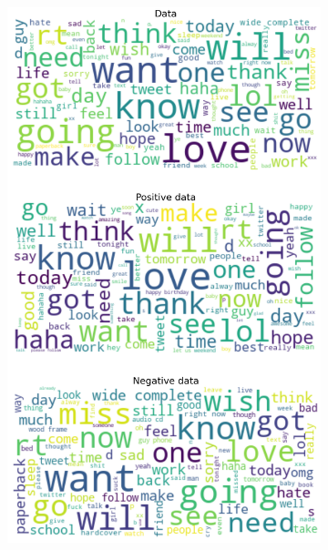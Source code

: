 \documentclass{article}
\begin{document}
\begin{itemize}
\begin{figure}[H]
\begin{subfigure}[b]{0.24\textwidth}
      \includegraphics[width=\textwidth]{chapter-06/section-01-01/10/visualization/2/wordcloud.png}
    \end{subfigure}
    \begin{subfigure}[b]{0.24\textwidth}
      \centering

\end{subfigure}
\end{figure}
\end{itemize}
\end{document}
